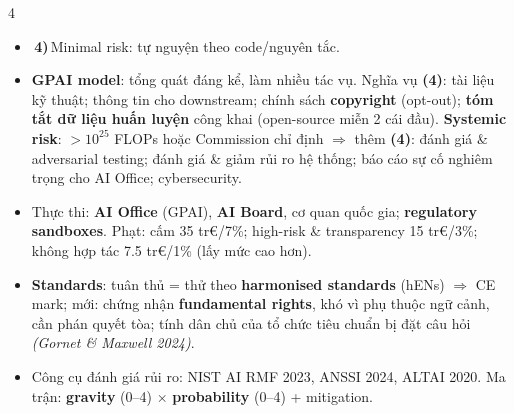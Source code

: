 \documentclass[10pt]{article}
\newcommand{\kw}[1]{\textbf{#1}}
\newcommand{\cnt}[1]{{\color{h2}\bfseries(#1)}}
\newcommand{\n}[1]{\,{\color{h2}\bfseries#1)}\,}
\newcommand{\ct}[1]{{\color{h1}\itshape(#1)}}
\begin{document}
\begin{multicols*}{4}
\begin{itemize}
\item \n4Minimal risk: tự nguyện theo code/nguyên tắc.
\item \kw{GPAI model}: tổng quát đáng kể, làm nhiều tác vụ. Nghĩa vụ \cnt{4}: tài liệu kỹ thuật; thông tin cho downstream; chính sách \kw{copyright} (opt-out); \kw{tóm tắt dữ liệu huấn luyện} công khai (open-source miễn 2 cái đầu). \kw{Systemic risk}: $>10^{25}$ FLOPs hoặc Commission chỉ định $\Rightarrow$ thêm \cnt{4}: đánh giá \& adversarial testing; đánh giá \& giảm rủi ro hệ thống; báo cáo sự cố nghiêm trọng cho AI Office; cybersecurity.
\item Thực thi: \kw{AI Office} (GPAI), \kw{AI Board}, cơ quan quốc gia; \kw{regulatory sandboxes}. Phạt: cấm 35 tr€/7\%; high-risk \& transparency 15 tr€/3\%; không hợp tác 7.5 tr€/1\% (lấy mức cao hơn).
\item \kw{Standards}: tuân thủ = thử theo \kw{harmonised standards} (hENs) $\Rightarrow$ CE mark; mới: chứng nhận \kw{fundamental rights}, khó vì phụ thuộc ngữ cảnh, cần phán quyết tòa; tính dân chủ của tổ chức tiêu chuẩn bị đặt câu hỏi \ct{Gornet \& Maxwell 2024}.
\item Công cụ đánh giá rủi ro: NIST AI RMF 2023, ANSSI 2024, ALTAI 2020. Ma trận: \kw{gravity} (0--4) $\times$ \kw{probability} (0--4) + mitigation.
\end{itemize}


\end{multicols*}
\end{document}
